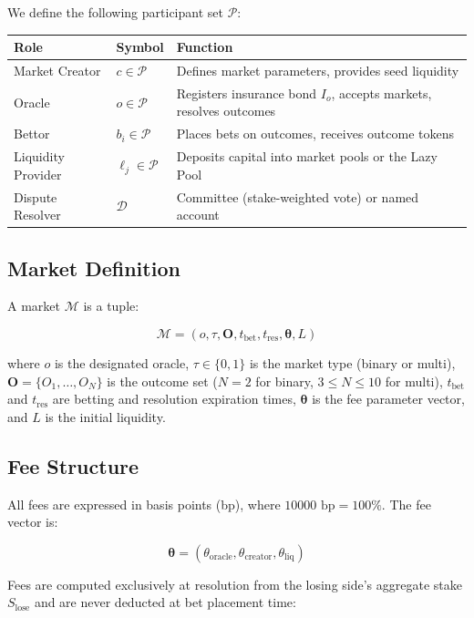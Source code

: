 \documentclass{ledger}
\theoremstyle{plain}
\theoremstyle{remark}
\begin{document}
We define the following participant set $\mathcal{P}$:

\begin{center}
\begin{tabular}{lll}
\hline
\textbf{Role} & \textbf{Symbol} & \textbf{Function} \\
\hline
Market Creator & $c \in \mathcal{P}$ & Defines market parameters, provides seed liquidity \\
Oracle & $o \in \mathcal{P}$ & Registers insurance bond $I_o$, accepts markets, resolves outcomes \\
Bettor & $b_i \in \mathcal{P}$ & Places bets on outcomes, receives outcome tokens \\
Liquidity Provider & $\ell_j \in \mathcal{P}$ & Deposits capital into market pools or the Lazy Pool \\
Dispute Resolver & $\mathcal{D}$ & Committee (stake-weighted vote) or named account \\
\hline
\end{tabular}
\end{center}

\subsection{Market Definition}

A market $\mathcal{M}$ is a tuple:

\[
\mathcal{M} = (o, \tau, \mathbf{O}, t_{\text{bet}}, t_{\text{res}},
\boldsymbol{\theta}, L)
\]

where $o$ is the designated oracle, $\tau \in \{0, 1\}$ is the market type
(binary or multi), $\mathbf{O} = \{O_1, \ldots, O_N\}$ is the outcome set
($N = 2$ for binary, $3 \leq N \leq 10$ for multi), $t_{\text{bet}}$ and
$t_{\text{res}}$ are betting and resolution expiration times,
$\boldsymbol{\theta}$ is the fee parameter vector, and $L$ is the initial
liquidity.

\subsection{Fee Structure}\label{sec:fees}

All fees are expressed in basis points (bp), where $10000 \text{ bp} = 100\%$.
The fee vector is:

\[
\boldsymbol{\theta} = (\theta_{\text{oracle}}, \theta_{\text{creator}},
\theta_{\text{liq}})
\]

Fees are computed exclusively at resolution from the losing side's aggregate
stake $S_{\text{lose}}$ and are never deducted at bet placement time:
\end{document}
